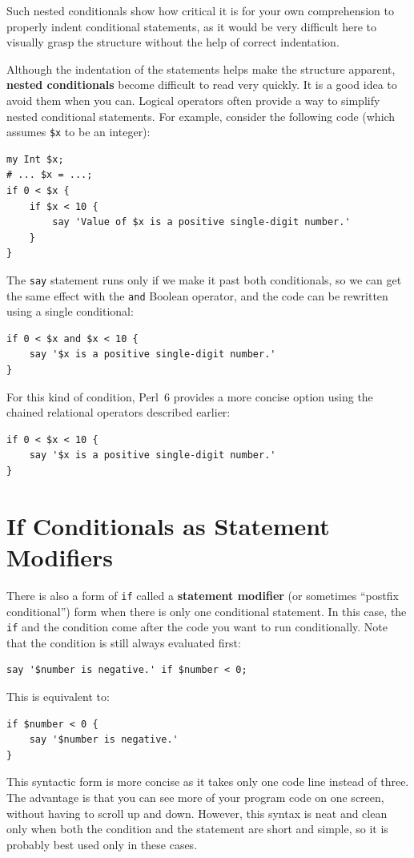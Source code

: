 Such nested conditionals show how critical it is for your 
own comprehension to properly indent conditional statements, 
as it would be very difficult here to visually grasp the 
structure without the help of correct indentation.

Although the indentation of 
the statements helps make the structure apparent, 
{\bf nested conditionals} become difficult to read very 
quickly.  It is a good idea to avoid them when you can.
Logical operators often provide a way to simplify nested 
conditional statements.  For example, consider the 
following code (which assumes \verb'$x' to be an integer):

\begin{verbatim}
my Int $x;
# ... $x = ...;
if 0 < $x {
    if $x < 10 {
        say 'Value of $x is a positive single-digit number.'
    }
}
\end{verbatim}
%
The {\tt say} statement runs only if we make it past both
conditionals, so we can get the same effect with the {\tt and} 
Boolean operator, and the code can be rewritten using a 
single conditional:

\begin{verbatim}
if 0 < $x and $x < 10 {
    say '$x is a positive single-digit number.'
}
\end{verbatim}

For this kind of condition, Perl~6 provides a more concise 
option using the chained relational operators described earlier:

\begin{verbatim}
if 0 < $x < 10 {
    say '$x is a positive single-digit number.'
}
\end{verbatim}

\section{If Conditionals as Statement Modifiers}
 
 

There is also a form of {\tt if} called a {\bf statement 
modifier} (or sometimes  ``postfix conditional'') form when there is only 
one conditional statement. In this case, the {\tt if} and the 
condition come after the code you want to run conditionally. Note 
that the condition is still always evaluated first:

\begin{verbatim}
say '$number is negative.' if $number < 0;
\end{verbatim}
%
This is equivalent to:
\begin{verbatim}
if $number < 0 {
    say '$number is negative.' 
}
\end{verbatim}
%
This syntactic form is more concise as it takes only one code 
line instead of three. The advantage is that you can see more
of your program code on one screen, without having to scroll up 
and down. However, this syntax is neat and clean only when 
both the condition and the statement are short and simple, so it 
is probably best used only in these cases.

